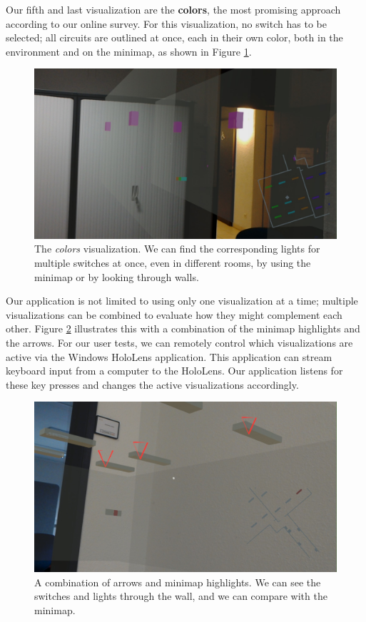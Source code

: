 Our fifth and last visualization are the \textbf{colors}, the most promising approach according to our online survey. For this visualization, no switch has to be selected; all circuits are outlined at once, each in their own color, both in the environment and on the minimap, as shown in Figure \ref{fig:colors_vis}.

\begin{figure}
    \centering
    \includegraphics[width=1.0\linewidth]{resources/implementation/colors.jpg}
    \caption{The \textit{colors} visualization. We can find the corresponding lights for multiple switches at once, even in different rooms, by using the minimap or by looking through walls.}
    \label{fig:colors_vis}
\end{figure}

Our application is not limited to using only one visualization at a time; multiple visualizations can be combined to evaluate how they might complement each other. Figure \ref{fig:combo_vis} illustrates this with a combination of the minimap highlights and the arrows. For our user tests, we can remotely control which visualizations are active via the Windows HoloLens application. This application can stream keyboard input from a computer to the HoloLens. Our application listens for these key presses and changes the active visualizations accordingly.

\begin{figure}
    \centering
    \includegraphics[width=1.0\linewidth]{resources/implementation/combo.jpg}
    \caption{A combination of arrows and minimap highlights. We can see the switches and lights through the wall, and we can compare with the minimap.}
    \label{fig:combo_vis}
\end{figure}
